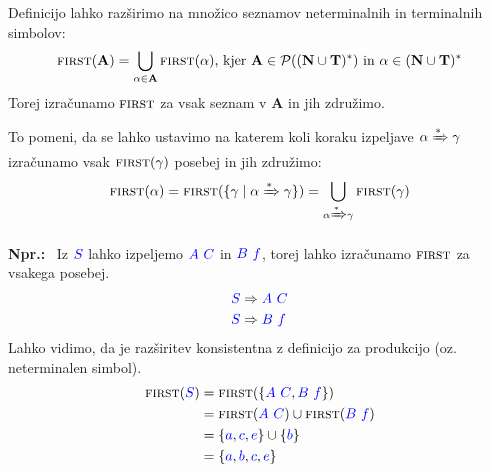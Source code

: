 \documentclass{article}
\newcommand{\Ex}{\textbf{Npr.:}\ }
\newcommand{\FIRST}{\textsc{first}}
\newcommand{\Set}[1]{\mathbf{#1}}
\newcommand{\Symbol}[1]{\textcolor{blue}{#1}}
\newcommand{\Terminals}{\Set{T}}
\newcommand{\NonTerminals}{\Set{N}}
\newcommand{\Powerset}[1]{\mathcal{P}(#1)}
\newcommand{\Derive}{\Rightarrow}
\newcommand{\DeriveStar}{\xRightarrow{\ast}}
\newcommand{\Seq}{\ }
\newcommand{\Kleene}[1]{#1^\ast}
\begin{document}
Definicijo lahko razširimo na množico seznamov neterminalnih in terminalnih simbolov:
\begin{equation*}
  \FIRST(\Set{A}) = \bigcup_{\alpha \in \Set{A}} \FIRST(\alpha) \text{, kjer } \Set{A} \in \Powerset{\Kleene{(\NonTerminals \cup \Terminals)}} \text{ in } \alpha \in \Kleene{(\NonTerminals \cup \Terminals)}
\end{equation*}
Torej izračunamo $\FIRST$ za vsak seznam v $\Set{A}$ in jih združimo.

To pomeni, da se lahko ustavimo na katerem koli koraku izpeljave $\alpha \DeriveStar \gamma$ izračunamo vsak $\FIRST(\gamma)$ posebej in jih združimo:
\begin{equation*}
  \FIRST(\alpha) = \FIRST(\{\gamma \mid \alpha \DeriveStar \gamma\}) = \bigcup_{\alpha \DeriveStar \gamma} \FIRST(\gamma)
\end{equation*}

\Ex
  Iz $\Symbol{S}$ lahko izpeljemo $\Symbol{A} \Seq \Symbol{C}$ in $\Symbol{B} \Seq \Symbol{f}$, torej lahko izračunamo $\FIRST$ za vsakega posebej.
  \begin{align*}
    \Symbol{S} &\Derive \Symbol{A} \Seq \Symbol{C}\\
    \Symbol{S} &\Derive \Symbol{B} \Seq \Symbol{f}
  \end{align*}
  Lahko vidimo, da je razširitev konsistentna z definicijo za produkcijo (oz. neterminalen simbol).
  \begin{align*}
    \FIRST(\Symbol{S}) &= \FIRST(\{\Symbol{A} \Seq \Symbol{C}, \Symbol{B} \Seq \Symbol{f}\}) \\
              &= \FIRST(\Symbol{A} \Seq \Symbol{C}) \cup \FIRST(\Symbol{B} \Seq \Symbol{f})\\
              &= \{\Symbol{a}, \Symbol{c}, \Symbol{e}\} \cup \{\Symbol{b}\} \\
              &= \{\Symbol{a}, \Symbol{b}, \Symbol{c}, \Symbol{e}\}
  \end{align*}
\end{document}
